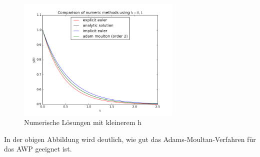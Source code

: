 \documentclass{article}
\begin{document}
				\newpage
				
				\begin{figure}[htbp] 
					\centering
					\includegraphics[width=0.7\textwidth]{numeric_plots2.png}
					\caption{Numerische Lösungen mit kleinerem h}
					\label{fig:Bild3}
				\end{figure}
				
				In der obigen Abbildung wird deutlich, wie gut das Adams-Moultan-Verfahren für das AWP geeignet ist.
	
\end{document}
